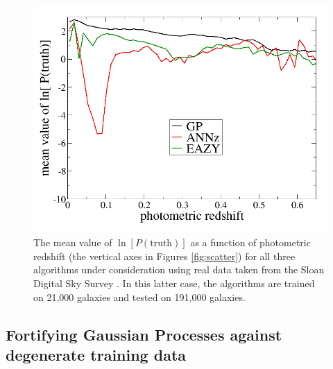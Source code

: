 \documentclass[prd,nofootbib,floatfix,11pt,tightenlines,nofootinbib]{revtex4}
\begin{document}
\begin{figure}[t]
\centerline{\includegraphics[scale=0.3]{sdss_lnsum.png}}
\caption{
The mean value of
$\ln[P(\text{truth})]$ as a function of photometric redshift (the vertical
axes in Figures \ref{fig:scatter}) for all
three algorithms under consideration using real
data taken from the Sloan Digital Sky Survey \cite{Abazajian:2008wr}.  
In this latter case, the
algorithms are trained on 21,000 galaxies and tested on 191,000 galaxies.
}
\label{fig:lnsum}
\end{figure}

\subsection{Fortifying Gaussian Processes against degenerate training data}
\label{sec:multimode}
\end{document}
